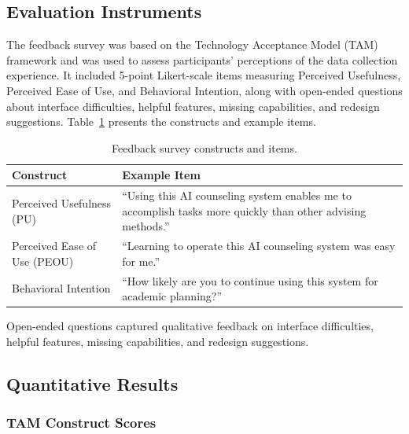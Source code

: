 \documentclass[letterpaper,11pt]{article}
\begin{document}
\subsection{Evaluation Instruments}\label{subsec:instruments}

The feedback survey was based on the Technology Acceptance Model (TAM) framework \parencite{davis1989} and was used to assess participants' perceptions of the data collection experience. It included 5-point Likert-scale items measuring Perceived Usefulness, Perceived Ease of Use, and Behavioral Intention, along with open-ended questions about interface difficulties, helpful features, missing capabilities, and redesign suggestions. Table~\ref{tab:constructs} presents the constructs and example items.

\begin{table}[htbp]
\centering
\caption{Feedback survey constructs and items.}
\label{tab:constructs}
\begin{tabular}{@{}lp{8cm}@{}}
\toprule
\textbf{Construct} & \textbf{Example Item} \\
\midrule
Perceived Usefulness (PU) & ``Using this AI counseling system enables me to accomplish tasks more quickly than other advising methods.'' \\
Perceived Ease of Use (PEOU) & ``Learning to operate this AI counseling system was easy for me.'' \\
Behavioral Intention & ``How likely are you to continue using this system for academic planning?'' \\
\bottomrule
\end{tabular}
\end{table}

Open-ended questions captured qualitative feedback on interface difficulties, helpful features, missing capabilities, and redesign suggestions.

\subsection{Quantitative Results}\label{subsec:quantresults}

\subsubsection{TAM Construct Scores}
\end{document}
